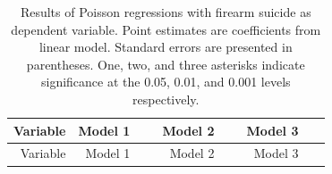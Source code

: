 \documentclass[]{article}
\begin{document}
\begin{longtable}[c]{@{}rrrrrrr@{}}
\caption{Results of Poisson regressions with firearm suicide as
dependent variable. Point estimates are coefficients from linear model.
Standard errors are presented in parentheses. One, two, and three
asterisks indicate significance at the 0.05, 0.01, and 0.001 levels
respectively.}\tabularnewline
\toprule
\begin{minipage}[b]{0.12\columnwidth}\raggedleft\strut
Variable
\strut\end{minipage} &
\begin{minipage}[b]{0.11\columnwidth}\raggedleft\strut
Model 1
\strut\end{minipage} &
\begin{minipage}[b]{0.12\columnwidth}\raggedleft\strut
~
\strut\end{minipage} &
\begin{minipage}[b]{0.11\columnwidth}\raggedleft\strut
Model 2
\strut\end{minipage} &
\begin{minipage}[b]{0.12\columnwidth}\raggedleft\strut
~
\strut\end{minipage} &
\begin{minipage}[b]{0.11\columnwidth}\raggedleft\strut
Model 3
\strut\end{minipage} &
\begin{minipage}[b]{0.11\columnwidth}\raggedleft\strut
~
\strut\end{minipage}\tabularnewline
\midrule
\endfirsthead
\toprule
\begin{minipage}[b]{0.12\columnwidth}\raggedleft\strut
Variable
\strut\end{minipage} &
\begin{minipage}[b]{0.11\columnwidth}\raggedleft\strut
Model 1
\strut\end{minipage} &
\begin{minipage}[b]{0.12\columnwidth}\raggedleft\strut
~
\strut\end{minipage} &
\begin{minipage}[b]{0.11\columnwidth}\raggedleft\strut
Model 2
\strut\end{minipage} &
\begin{minipage}[b]{0.12\columnwidth}\raggedleft\strut
~
\strut\end{minipage} &
\begin{minipage}[b]{0.11\columnwidth}\raggedleft\strut
Model 3
\strut\end{minipage} &
\begin{minipage}[b]{0.11\columnwidth}\raggedleft\strut

\end{minipage}
\end{longtable}
\end{document}
